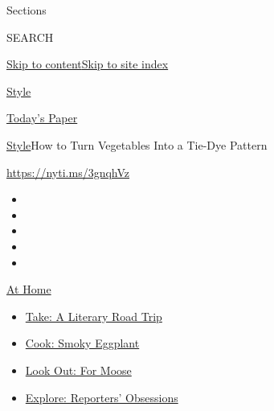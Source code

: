 Sections

SEARCH

\protect\hyperlink{site-content}{Skip to
content}\protect\hyperlink{site-index}{Skip to site index}

\href{https://www.nytimes3xbfgragh.onion/section/style}{Style}

\href{https://myaccount.nytimes3xbfgragh.onion/auth/login?response_type=cookie\&client_id=vi}{}

\href{https://www.nytimes3xbfgragh.onion/section/todayspaper}{Today's
Paper}

\href{/section/style}{Style}\textbar{}How to Turn Vegetables Into a
Tie-Dye Pattern

\url{https://nyti.ms/3gnqhVz}

\begin{itemize}
\item
\item
\item
\item
\item
\end{itemize}

\href{https://www.nytimes3xbfgragh.onion/spotlight/at-home?action=click\&pgtype=Article\&state=default\&region=TOP_BANNER\&context=at_home_menu}{At
Home}

\begin{itemize}
\tightlist
\item
  \href{https://www.nytimes3xbfgragh.onion/2020/07/28/books/time-for-a-literary-road-trip.html?action=click\&pgtype=Article\&state=default\&region=TOP_BANNER\&context=at_home_menu}{Take:
  A Literary Road Trip}
\item
  \href{https://www.nytimes3xbfgragh.onion/2020/07/29/magazine/bored-with-your-home-cooking-some-smoky-eggplant-will-fix-that.html?action=click\&pgtype=Article\&state=default\&region=TOP_BANNER\&context=at_home_menu}{Cook:
  Smoky Eggplant}
\item
  \href{https://www.nytimes3xbfgragh.onion/2020/07/27/travel/moose-michigan-isle-royale.html?action=click\&pgtype=Article\&state=default\&region=TOP_BANNER\&context=at_home_menu}{Look
  Out: For Moose}
\item
  \href{https://www.nytimes3xbfgragh.onion/interactive/2020/at-home/even-more-reporters-editors-diaries-lists-recommendations.html?action=click\&pgtype=Article\&state=default\&region=TOP_BANNER\&context=at_home_menu}{Explore:
  Reporters' Obsessions}
\end{itemize}

